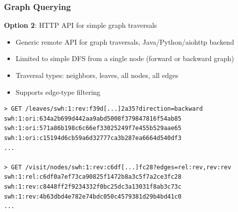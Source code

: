 \documentclass[aspectratio=169,xcolor=table]{beamer}
\begin{document}
    \begin{frame}[fragile]
        \frametitle{Graph Querying}

        \begin{block}{}
            \textbf{Option 2}: HTTP API for simple graph traversals

            \begin{itemize}
                \item Generic remote API for graph traversals, Java/Python/aiohttp backend
                \item Limited to simple DFS from a single node (forward or
                    backward graph)
                \item Traversal types: neighbors, leaves, all nodes, all edges
                \item Supports edge-type filtering
            \end{itemize}
        \end{block}

        \begin{verbatim}
> GET /leaves/swh:1:rev:f39d[...]2a35?direction=backward
swh:1:ori:634a2b699d442aa9abd5008f379847816f54ab85
swh:1:ori:571a86b198c6c66ef33025249f7e455b529aae65
swh:1:ori:c15194d6cb59a6d32777ca3b287ea6664d540df3
...

> GET /visit/nodes/swh:1:rev:c6df[...]fc28?edges=rel:rev,rev:rev
swh:1:rel:c6df0a7ef73ca90825f1472b8a3c5f7a2ce3fc28
swh:1:rev:c8448ff2f9234332f0bc25dc3a13031f8ab3c73c
swh:1:rev:4b63dbd4e782e74bdc050c4579381d29b4bd41c0
...
        \end{verbatim}
    \end{frame}
\end{document}
